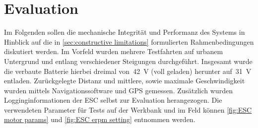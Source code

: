 \chapter{Evaluation}
	Im Folgenden sollen die mechanische Integrität und Performanz des Systems in Hinblick auf die in \cref{sec:constructive limitations} formulierten Rahmenbedingungen diskutiert werden.
	Im Vorfeld wurden mehrere Testfahrten auf urbanem Untergrund und entlang verschiedener Steigungen durchgeführt.
	Insgesamt wurde die verbaute Batterie hierbei dreimal von~\qty{42}{\volt} (voll geladen) herunter auf~\qty{31}{\volt} entladen.
	Zurückgelegte Distanz und mittlere, sowie maximale Geschwindigkeit wurden mittels Navigationssoftware und GPS gemessen.
	Zusätzlich wurden Logginginformationen der ESC selbst zur Evaluation herangezogen.
	Die verwendeten Parameter für Tests auf der Werkbank und im Feld können \cref{fig:ESC motor params} und \cref{fig:ESC erpm setting} entnommen werden.
